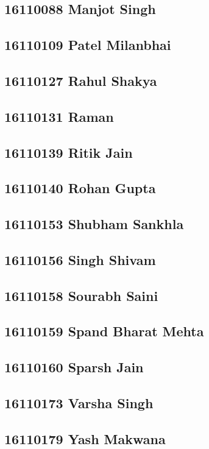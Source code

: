 \documentclass[journal=jpcbfk,manuscript=article]{achemso}
\begin{document}
\subsection {16110088	Manjot Singh}

\subsection {16110109	Patel Milanbhai}

\subsection {16110127	Rahul Shakya}

\subsection {16110131	Raman}

\subsection {16110139	Ritik Jain}

\subsection {16110140	Rohan Gupta}

\subsection {16110153	Shubham Sankhla}

\subsection {16110156	Singh Shivam}

\subsection {16110158	Sourabh Saini}

\subsection {16110159	Spand Bharat Mehta}

\subsection {16110160	Sparsh Jain}

\subsection {16110173	Varsha Singh}

\subsection {16110179	Yash Makwana}


%
%
\end{document}
